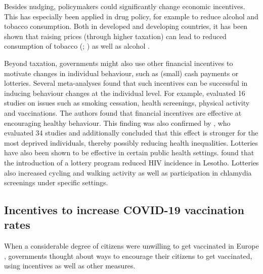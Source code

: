 \documentclass{scrbook}
\begin{document}
Besides nudging, policymakers could significantly change economic
incentives. This has especially been applied in drug policy, for example
to reduce alcohol and tobacco consumption. Both in developed and
developing countries, it has been shown that raising prices (through
higher taxation) can lead to reduced consumption of tobacco
(\cite{yeh_effects_2017}; \cite{immurana_effects_2021}) as well as
alcohol \parencite{daley_impact_2012}.

Beyond taxation, governments might also use other financial incentives
to motivate changes in individual behaviour, such as (small) cash
payments or lotteries. Several meta-analyses found that such incentives
can be successful in inducing behaviour changes at the individual level.
For example, \textcite{giles_effectiveness_2014} evaluated 16 studies on
issues such as smoking cessation, health screenings, physical activity
and vaccinations. The authors found that financial incentives are
effective at encouraging healthy behaviour. This finding was also
confirmed by \textcite{mantzari_personal_2015}, who evaluated 34 studies
and additionally concluded that this effect is stronger for the most
deprived individuals, thereby possibly reducing health inequalities.
Lotteries have also been shown to be effective in certain public health
settings. \textcite{bjorkman_nyqvist_incentivizing_2018} found that the
introduction of a lottery program reduced HIV incidence in Lesotho.
Lotteries also increased cycling \parencite{ciccone_using_2021} and
walking activity \parencite{patel_randomized_2018} as well as
participation in chlamydia screenings \parencite{niza_vouchers_2014}
under specific settings.

\subsection*{Incentives to increase COVID-19 vaccination rates}

When a considerable degree of citizens were unwilling to get vaccinated
in Europe \parencite{steinert_covid-19_2022}, governments thought about
ways to encourage their citizens to get vaccinated, using incentives as
well as other measures.
\end{document}
